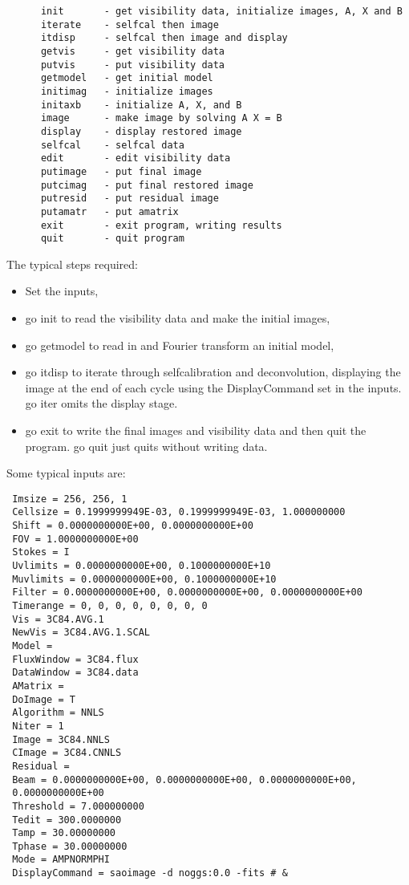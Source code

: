 \begin{verbatim}
      init       - get visibility data, initialize images, A, X and B
      iterate    - selfcal then image
      itdisp     - selfcal then image and display
      getvis     - get visibility data
      putvis     - put visibility data
      getmodel   - get initial model
      initimag   - initialize images
      initaxb    - initialize A, X, and B
      image      - make image by solving A X = B
      display    - display restored image
      selfcal    - selfcal data
      edit       - edit visibility data
      putimage   - put final image
      putcimag   - put final restored image
      putresid   - put residual image
      putamatr   - put amatrix
      exit       - exit program, writing results
      quit       - quit program
\end{verbatim}

The typical steps required:
\begin{itemize}
\item Set the inputs,
\item go init to read the visibility data and make the initial images,
\item go getmodel to read in and Fourier transform an initial model,
\item go itdisp to iterate through selfcalibration and deconvolution,
displaying the image at the end of each cycle using the DisplayCommand
set in the inputs. go iter omits the display stage.
\item go exit to write the final images and visibility data and then
quit the program. go quit just quits without writing data.
\end{itemize}

Some typical inputs are:
\begin{verbatim}
 Imsize = 256, 256, 1
 Cellsize = 0.1999999949E-03, 0.1999999949E-03, 1.000000000
 Shift = 0.0000000000E+00, 0.0000000000E+00
 FOV = 1.0000000000E+00
 Stokes = I
 Uvlimits = 0.0000000000E+00, 0.1000000000E+10
 Muvlimits = 0.0000000000E+00, 0.1000000000E+10
 Filter = 0.0000000000E+00, 0.0000000000E+00, 0.0000000000E+00
 Timerange = 0, 0, 0, 0, 0, 0, 0, 0
 Vis = 3C84.AVG.1
 NewVis = 3C84.AVG.1.SCAL
 Model =
 FluxWindow = 3C84.flux
 DataWindow = 3C84.data
 AMatrix =
 DoImage = T
 Algorithm = NNLS
 Niter = 1
 Image = 3C84.NNLS
 CImage = 3C84.CNNLS
 Residual =
 Beam = 0.0000000000E+00, 0.0000000000E+00, 0.0000000000E+00,
 0.0000000000E+00
 Threshold = 7.000000000
 Tedit = 300.0000000
 Tamp = 30.00000000
 Tphase = 30.00000000
 Mode = AMPNORMPHI
 DisplayCommand = saoimage -d noggs:0.0 -fits # &
\end{verbatim}

